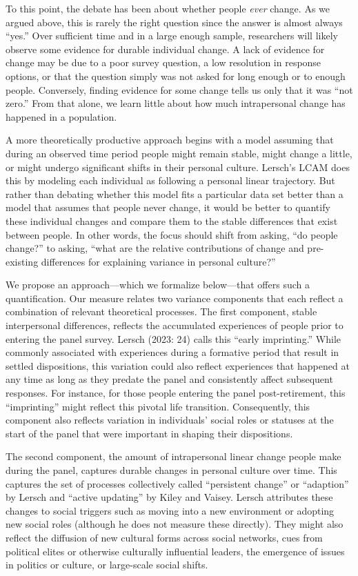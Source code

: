 \documentclass[
  12pt,
]{article}
\begin{document}
To this point, the debate has been about whether people \emph{ever}
change. As we argued above, this is rarely the right question since the
answer is almost always ``yes.'' Over sufficient time and in a large
enough sample, researchers will likely observe some evidence for durable
individual change. A lack of evidence for change may be due to a poor
survey question, a low resolution in response options, or that the
question simply was not asked for long enough or to enough people.
Conversely, finding evidence for some change tells us only that it was
``not zero.'' From that alone, we learn little about how much
intrapersonal change has happened in a population.

A more theoretically productive approach begins with a model assuming
that during an observed time period people might remain stable, might
change a little, or might undergo significant shifts in their personal
culture. Lersch's LCAM does this by modeling each individual as
following a personal linear trajectory. But rather than debating whether
this model fits a particular data set better than a model that assumes
that people never change, it would be better to quantify these
individual changes and compare them to the stable differences that exist
between people. In other words, the focus should shift from asking, ``do
people change?'' to asking, ``what are the relative contributions of
change and pre-existing differences for explaining variance in personal
culture?''

We propose an approach---which we formalize below---that offers such a
quantification. Our measure relates two variance components that each
reflect a combination of relevant theoretical processes. The first
component, stable interpersonal differences, reflects the accumulated
experiences of people prior to entering the panel survey. Lersch (2023:
24) calls this ``early imprinting.'' While commonly associated with
experiences during a formative period that result in settled
dispositions, this variation could also reflect experiences that
happened at any time as long as they predate the panel and consistently
affect subsequent responses. For instance, for those people entering the
panel post-retirement, this ``imprinting'' might reflect this pivotal
life transition. Consequently, this component also reflects variation in
individuals' social roles or statuses at the start of the panel that
were important in shaping their dispositions.

The second component, the amount of intrapersonal linear change people
make during the panel, captures durable changes in personal culture over
time. This captures the set of processes collectively called
``persistent change'' or ``adaption'' by Lersch and ``active updating''
by Kiley and Vaisey. Lersch attributes these changes to social triggers
such as moving into a new environment or adopting new social roles
(although he does not measure these directly). They might also reflect
the diffusion of new cultural forms across social networks, cues from
political elites or otherwise culturally influential leaders, the
emergence of issues in politics or culture, or large-scale social
shifts.
\end{document}
